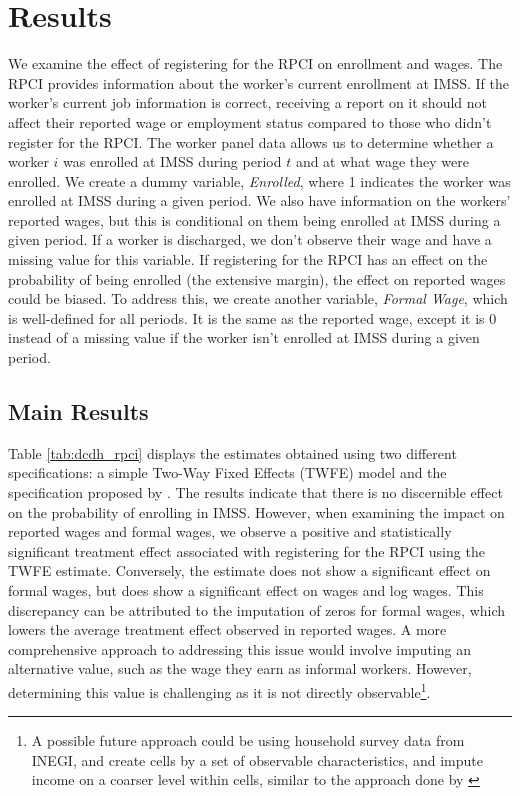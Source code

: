 \documentclass[10pt, oneside]{book}
\begin{document}
\chapter{Results} \label{results}

We examine the effect of registering for the RPCI on enrollment and wages. The RPCI provides information about the worker's current enrollment at IMSS. If the worker's current job information is correct, receiving a report on it should not affect their reported wage or employment status compared to those who didn't register for the RPCI. The worker panel data allows us to determine whether a worker $i$ was enrolled at IMSS during period $t$ and at what wage they were enrolled. We create a dummy variable, \textit{Enrolled}, where 1 indicates the worker was enrolled at IMSS during a given period. We also have information on the workers' reported wages, but this is conditional on them being enrolled at IMSS during a given period. If a worker is discharged, we don't observe their wage and have a missing value for this variable. If registering for the RPCI has an effect on the probability of being enrolled (the extensive margin), the effect on reported wages could be biased. To address this, we create another variable, \textit{Formal Wage}, which is well-defined for all periods. It is the same as the reported wage, except it is 0 instead of a missing value if the worker isn't enrolled at IMSS during a given period. \\

\section{Main Results}

Table \ref{tab:dcdh_rpci} displays the estimates obtained using two different specifications: a simple Two-Way Fixed Effects (TWFE) model and the specification proposed by \cite{de2020two}. The results indicate that there is no discernible effect on the probability of enrolling in IMSS. However, when examining the impact on reported wages and formal wages, we observe a positive and statistically significant treatment effect associated with registering for the RPCI using the TWFE estimate. Conversely, the \cite{de2020two} estimate does not show a significant effect on formal wages, but does show a significant effect on wages and log wages. This discrepancy can be attributed to the imputation of zeros for formal wages, which lowers the average treatment effect observed in reported wages. A more comprehensive approach to addressing this issue would involve imputing an alternative value, such as the wage they earn as informal workers. However, determining this value is challenging as it is not directly observable\footnote{A possible future approach could be using household survey data from INEGI, and create cells by a set of observable characteristics, and impute income on a coarser level within cells, similar to the approach done by \cite{kumler2020enlisting}}. \\
\end{document}
